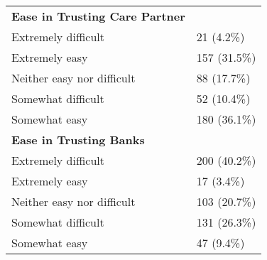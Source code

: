 \begin{longtable}{ll}
\textbf{Ease in Trusting Care Partner} & \\
\hspace{1em}Extremely difficult & 21 (4.2\%) \\
\hspace{1em}Extremely easy & 157 (31.5\%) \\
\hspace{1em}Neither easy nor difficult & 88 (17.7\%) \\
\hspace{1em}Somewhat difficult & 52 (10.4\%) \\
\hspace{1em}Somewhat easy & 180 (36.1\%) \\

\textbf{Ease in Trusting Banks} & \\
\hspace{1em}Extremely difficult & 200 (40.2\%) \\
\hspace{1em}Extremely easy & 17 (3.4\%) \\
\hspace{1em}Neither easy nor difficult & 103 (20.7\%) \\
\hspace{1em}Somewhat difficult & 131 (26.3\%) \\
\hspace{1em}Somewhat easy & 47 (9.4\%) \\
\end{longtable}
